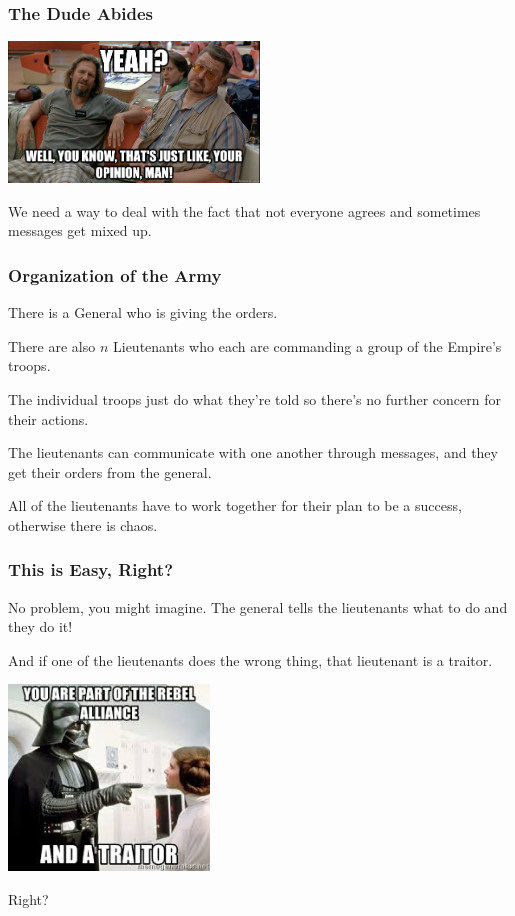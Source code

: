 \begin{frame}
	\frametitle{The Dude Abides}
	\begin{center}
		\includegraphics[width=0.5\textwidth]{images/opinion.jpg}
	\end{center}

	We need a way to deal with the fact that not everyone agrees and sometimes messages get mixed up.

\end{frame}

\begin{frame}
	\frametitle{Organization of the Army}

	There is a \alert{General} who is giving the orders.

	There are also $n$ \alert{Lieutenants} who each are commanding a group of the Empire's troops.

	The individual troops just do what they're told so there's no further concern for their actions.

	The lieutenants can communicate with one another through messages, and they get their orders from the general.

	All of the lieutenants have to work together for their plan to be a success, otherwise there is chaos.
\end{frame}


\begin{frame}
	\frametitle{This is Easy, Right?}

	No problem, you might imagine. The general tells the lieutenants what to do and they do it!

	And if one of the lieutenants does the wrong thing, that lieutenant is a traitor.

	\begin{center}
		\includegraphics[width=0.4\textwidth]{images/vader-traitor.jpeg}
	\end{center}

	Right?
\end{frame}

